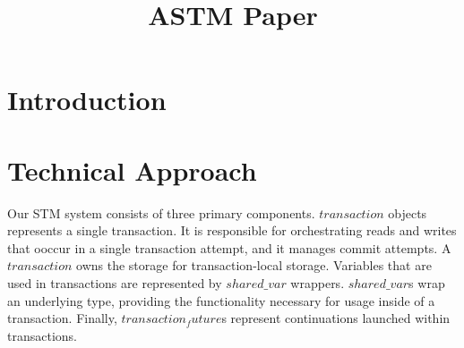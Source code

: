 \documentclass[conference]{IEEEtran}
\begin{document}
\title{ASTM Paper}

\author{
}

\maketitle


\begin{abstract}
\end{abstract}



\IEEEpeerreviewmaketitle


\section{Introduction}


\section{Technical Approach}

Our STM system consists of three primary components. $transaction$ objects
represents a single transaction. It is responsible for orchestrating reads and
writes that ooccur in a single transaction attempt, and it manages commit
attempts. A $transaction$ owns the storage for transaction-local
storage. Variables that are used in transactions are represented by
$shared\_var$ wrappers.  $shared\_var$s wrap an underlying type,
providing the functionality necessary for usage inside of a transaction.
Finally, $transaction_future$s represent continuations launched within
transactions.
\end{document}

